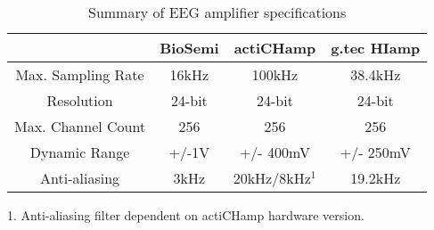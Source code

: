 \begin{table}[]
\centering
\caption{Summary of EEG amplifier specifications} 
\label{tableeeg}
\begin{tabular}{|c|c|c|c|}
\hline
\textbf{}          & \textbf{BioSemi} & \textbf{actiCHamp} & \textbf{g.tec HIamp} \\ \hline
Max. Sampling Rate & 16kHz            & 100kHz             & 38.4kHz              \\ \hline
Resolution         & 24-bit           & 24-bit             & 24-bit               \\ \hline
Max. Channel Count      & 256              & 256                & 256                  \\ \hline
Dynamic Range      & +/-1V            & +/- 400mV          & +/- 250mV            \\ \hline
Anti-aliasing      & 3kHz             & 20kHz/8kHz$^{1}$         &  19.2kHz      \\ \hline
\end{tabular}
\end{table}

1. Anti-aliasing filter dependent on actiCHamp hardware version.